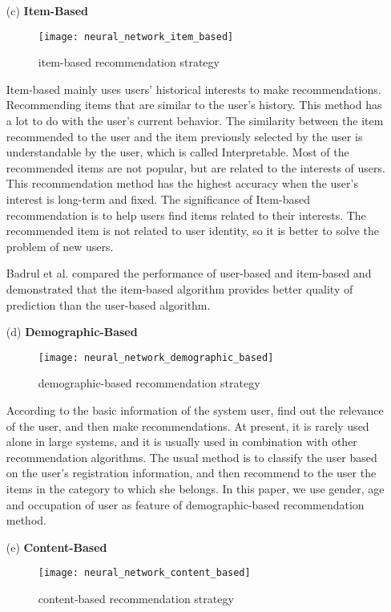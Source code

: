 \begin{itemize}
\item[(c)]\textbf{Item-Based}\\
\begin{figure}[h]
\caption{item-based recommendation strategy}
\centering
\texttt{[image: neural\_network\_item\_based]}
\end{figure}
Item-based mainly uses users' historical interests to make recommendations. Recommending items that are similar to the user's history. This method has a lot to do with the user's current behavior. The similarity between the item recommended to the user and the item previously selected by the user is understandable by the user, which is called Interpretable. Most of the recommended items are not popular, but are related to the interests of users. This recommendation method has the highest accuracy when the user's interest is long-term and fixed. The significance of Item-based recommendation is to help users find items related to their interests. The recommended item is not related to user identity, so it is better to solve the problem of new users.
\par Badrul et al.\cite{sarwar2001item} compared the performance of user-based and item-based and demonstrated that the item-based algorithm provides better quality of prediction than the user-based algorithm.
\item[(d)]\textbf{Demographic-Based}\\
\begin{figure}[h]
\caption{demographic-based recommendation strategy}
\centering
\texttt{[image: neural\_network\_demographic\_based]}
\end{figure}
According to the basic information of the system user, find out the relevance of the user, and then make recommendations. At present, it is rarely used alone in large systems, and it is usually used in combination with other recommendation algorithms. The usual method is to classify the user based on the user's registration information, and then recommend to the user the items in the category to which she belongs. In this paper, we use gender, age and occupation of user as feature of demographic-based recommendation method.
\item[(e)]\textbf{Content-Based}\\
\begin{figure}[h]
\caption{content-based recommendation strategy}
\centering
\texttt{[image: neural\_network\_content\_based]}
\end{figure}

\end{itemize}
